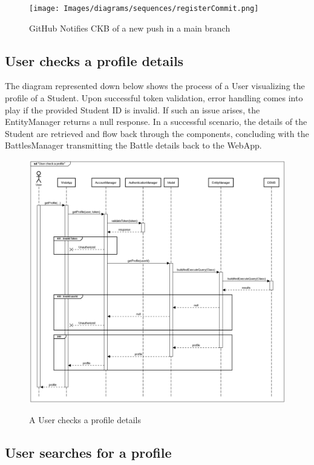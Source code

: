 \documentclass{Configuration_Files/Template}
\begin{document}
\begin{figure}[H]
\centering
\texttt{[image: Images/diagrams/sequences/registerCommit.png]}\\
\caption{GitHub Notifies CKB of a new push in a main branch}
\end{figure}

\subsection*{User checks a profile details}

The diagram represented down below shows the process of a User visualizing the profile of a Student. Upon successful token validation, error handling comes into play if the provided Student ID is invalid. If such an issue arises, the EntityManager returns a null response. In a successful scenario, the details of the Student are retrieved and flow back through the components, concluding with the BattlesManager transmitting the Battle details back to the WebApp.

\begin{figure}[H]
\centering
\includegraphics[scale = 0.33]{Images/diagrams/sequences/getProfile.png}\\
\caption{A User checks a profile details}
\end{figure}

\subsection*{User searches for a profile}
\end{document}
